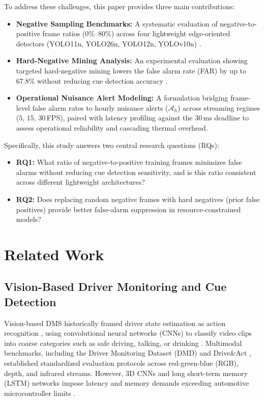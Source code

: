 \documentclass[conference]{IEEEtran}
\begin{document}
To address these challenges, this paper provides three main contributions: 

\begin{itemize}
    \item \textbf{Negative Sampling Benchmarks:} A systematic evaluation of negative-to-positive frame ratios (0\%--80\%) across four lightweight edge-oriented detectors (YOLO11n, YOLO26n, YOLO12n, YOLOv10n) \cite{yolodrowsiness2025, yolov12dms2025}. 
    \item \textbf{Hard-Negative Mining Analysis:} An experimental evaluation showing targeted hard-negative mining lowers the false alarm rate (FAR) by up to 67.8\% without reducing cue detection accuracy \cite{shrivastava2016ohem}. 
    \item \textbf{Operational Nuisance Alert Modeling:} A formulation bridging frame-level false alarm rates to hourly nuisance alerts ($\mathcal{A}_h$) across streaming regimes ($5$, $15$, $30$\,FPS), paired with latency profiling against the 30\,ms deadline to assess operational reliability and cascading thermal overhead. 
\end{itemize}

Specifically, this study answers two central research questions (RQs): 
\begin{itemize}
    \item \textbf{RQ1:} What ratio of negative-to-positive training frames minimizes false alarms without reducing cue detection sensitivity, and is this ratio consistent across different lightweight architectures? 
    \item \textbf{RQ2:} Does replacing random negative frames with hard negatives (prior false positives) provide better false-alarm suppression in resource-constrained models? 
\end{itemize}

\section{Related Work}

\subsection{Vision-Based Driver Monitoring and Cue Detection}
Vision-based DMS historically framed driver state estimation as action recognition \cite{ortega2020dmd, canas2021detection}, using convolutional neural networks (CNNs) to classify video clips into coarse categories such as safe driving, talking, or drinking \cite{ortega2020dmd, canas2021detection}. Multimodal benchmarks, including the Driver Monitoring Dataset (DMD) \cite{ortega2020dmd} and Drive\&Act \cite{martin2019drive}, established standardized evaluation protocols across red-green-blue (RGB), depth, and infrared streams. However, 3D CNNs and long short-term memory (LSTM) networks impose latency and memory demands exceeding automotive microcontroller limits \cite{canas2021detection, florez2024real}.
\end{document}
